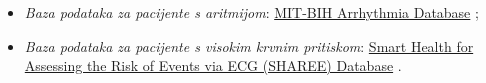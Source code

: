 \documentclass[12pt,a4paper]{article}
\begin{document}
\begin{itemize}
\renewcommand\labelitemi{-}

\item \textit{Baza podataka za pacijente s aritmijom}: \href{https://physionet.org/physiobank/database/mitdb/}{MIT-BIH Arrhythmia Database} \cite{mit-bih};

\item \textit{Baza podataka za pacijente s visokim krvnim pritiskom}: \href{https://physionet.org/physiobank/database/shareedb/}{Smart Health for Assessing the Risk of Events via ECG (SHAREE) Database} \cite{sharee}.

\end{itemize}

\newpage



\end{document}
